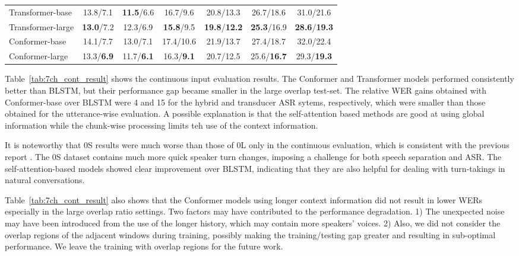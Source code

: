 \documentclass{article}
\begin{document}
\begin{table*}[!t]
\begin{tabular}{l|cccccc}
Transformer-base & 13.8/7.1 & \textbf{11.5}/6.6 & 16.7/9.6 & 20.8/13.3 & 26.7/18.6 & 31.0/21.6 \\
			Transformer-large & \textbf{13.0}/7.2 & 12.3/6.9 & \textbf{15.8}/9.5 & \textbf{19.8}/\textbf{12.2} & \textbf{25.3}/16.9 & \textbf{28.6}/\textbf{19.3} \\
			
			Conformer-base & 14.1/7.7 & 13.0/7.1 & 17.4/10.6 & 21.9/13.7 & 27.4/18.7 & 32.0/22.4 \\
			Conformer-large & 13.3/\textbf{6.9} & 11.7/\textbf{6.1} & 16.3/\textbf{9.1} & 20.7/12.5 & 25.6/\textbf{16.7} & 29.3/\textbf{19.3} \\ \hline
			
			\bottomrule
		\end{tabular}
\end{table*}
	


	Table~\ref{tab:7ch_cont_result} shows the continuous input evaluation results. 
The Conformer and Transformer models performed consistently better than BLSTM, but their performance gap became smaller in the large overlap test-set. The relative WER gains obtained with 
	Conformer-base over BLSTM were 4 and 15 for the hybrid and transducer ASR sytems, respectively, which were smaller than those obtained for the utterance-wise evaluation. 
	A possible explanation is that the self-attention based methods are good at using global information while the chunk-wise processing limits teh use of the context information. 
	
	It is noteworthy that 0S results were much worse than those of 0L only in the continuous evaluation, which is consistent with the previous report \cite{chen2020continuous}.
	The 0S dataset contains much more quick speaker turn changes, imposing a challenge for both speech separation and ASR.  
	The self-attention-based models showed clear improvement over BLSTM, indicating that they are also helpful for dealing with turn-takings in natural conversations. 
	


	Table~\ref{tab:7ch_cont_result} also shows that 
	the Conformer models using 
	longer context information did not result in lower WERs especially in the large overlap ratio settings. 
	Two factors may have contributed to the performance degradation. 
	1) The unexpected noise may have been introduced from the use of the longer history, which may contain more speakers' voices. 2) Also, we did not consider the overlap regions of the adjacent windows during training, possibly making the training/testing gap greater and resulting in sub-optimal performance. We leave the training with overlap regions for the future work. 
	
\end{document}

